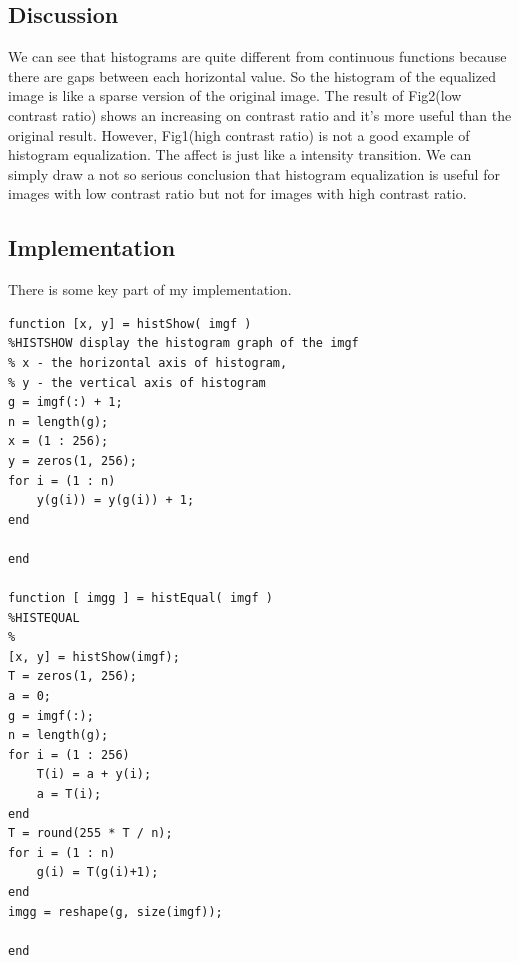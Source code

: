 \clearpage

\subsection{Discussion}
We can see that histograms are quite different from continuous functions because there are gaps between each horizontal value. So the histogram of the equalized image is like a sparse version of the original image. The result of Fig2(low contrast ratio) shows an increasing on contrast ratio and it's more useful than the original result. However, Fig1(high contrast ratio) is not a good example of histogram equalization. The affect is just like a intensity transition. We can simply draw a not so serious conclusion that histogram equalization is useful for images with low contrast ratio but not for images with high contrast ratio.

\subsection{Implementation}
There is some key part of my implementation.
\lstset{language=Matlab}
\begin{lstlisting}
function [x, y] = histShow( imgf )
%HISTSHOW display the histogram graph of the imgf
% x - the horizontal axis of histogram, 
% y - the vertical axis of histogram
g = imgf(:) + 1;
n = length(g);
x = (1 : 256);
y = zeros(1, 256);
for i = (1 : n)
    y(g(i)) = y(g(i)) + 1;
end

end

function [ imgg ] = histEqual( imgf )
%HISTEQUAL 
%   
[x, y] = histShow(imgf);
T = zeros(1, 256);
a = 0;
g = imgf(:);
n = length(g);
for i = (1 : 256)
    T(i) = a + y(i);
    a = T(i);
end
T = round(255 * T / n);
for i = (1 : n)
    g(i) = T(g(i)+1);
end
imgg = reshape(g, size(imgf));

end
\end{lstlisting}




